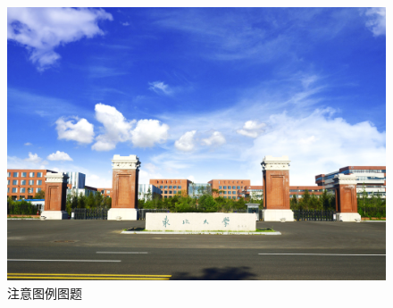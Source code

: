 \xiaosi 


\begin{figure}[H]
    \centering
    \includegraphics[width=0.8\linewidth]{img/fig1.jpg}
    \caption{注意图例图题}
    \label{fig:figure2}
\end{figure}
